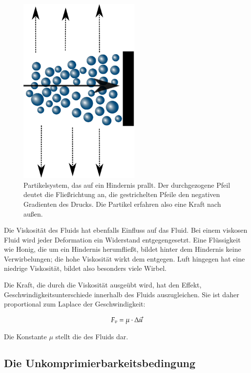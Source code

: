 \begin{figure}[ht]
\centering
\includegraphics[width=6cm]{images/particle_system_wall_collision}
\caption{Partikelsystem, das auf ein Hindernis prallt. Der durchgezogene Pfeil deutet die Fließrichtung an, die gestrichelten Pfeile den negativen Gradienten des Drucks. Die Partikel erfahren also eine Kraft nach außen.}
\label{fig:navier_stokes_particle_system_wall_collision}
\end{figure}

Die Viskosität des Fluids hat ebenfalls Einfluss auf das Fluid. Bei einem
viskosen Fluid wird jeder Deformation ein Widerstand entgegengesetzt. Eine
Flüssigkeit wie Honig, die um ein Hindernis herumfließt, bildet hinter dem
Hindernis keine Verwirbelungen; die hohe Viskosität wirkt dem entgegen. Luft
hingegen hat eine niedrige Viskosität, bildet also besonders viele Wirbel.

Die Kraft, die durch die Viskosität ausgeübt wird, hat den Effekt,
Geschwindigkeitsunterschiede innerhalb des Fluids auszugleichen. Sie ist
daher proportional zum Laplace der Geschwindigkeit:

\begin{equation}
\label{eq:navier_stokes_f_v}
F_v = \mu \cdot \Delta \vec{u}
\end{equation}

Die Konstante $\mu$ stellt die 
des Fluids dar.

\subsection{Die Unkomprimierbarkeitsbedingung}
\label{sec:mathematics_incompressibility_condition_section}

